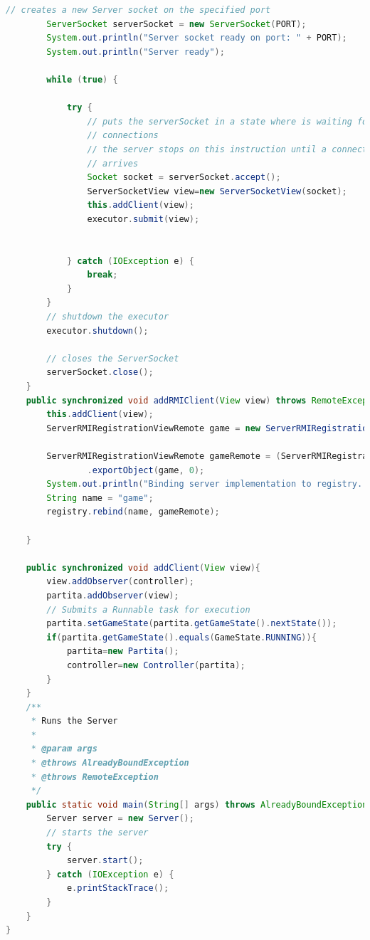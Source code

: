 \documentclass{article}
\begin{document}
\begin{lstlisting}[language=Java,escapechar=|]
		// creates a new Server socket on the specified port
		ServerSocket serverSocket = new ServerSocket(PORT);
		System.out.println("Server socket ready on port: " + PORT);
		System.out.println("Server ready");
		
		while (true) {

			try {
				// puts the serverSocket in a state where is waiting for client
				// connections
				// the server stops on this instruction until a connection
				// arrives
				Socket socket = serverSocket.accept();
				ServerSocketView view=new ServerSocketView(socket);
				this.addClient(view);
				executor.submit(view);
				

			} catch (IOException e) {
				break;
			}
		}
		// shutdown the executor
		executor.shutdown();

		// closes the ServerSocket
		serverSocket.close();
	}
	public synchronized void addRMIClient(View view) throws RemoteException, AlreadyBoundException{
		this.addClient(view);
		ServerRMIRegistrationViewRemote game = new ServerRMIRegistrationView(this);

		ServerRMIRegistrationViewRemote gameRemote = (ServerRMIRegistrationViewRemote) UnicastRemoteObject
				.exportObject(game, 0);
		System.out.println("Binding server implementation to registry...");
		String name = "game";
		registry.rebind(name, gameRemote);

	}

	public synchronized void addClient(View view){
		view.addObserver(controller);
		partita.addObserver(view);
		// Submits a Runnable task for execution
		partita.setGameState(partita.getGameState().nextState());
		if(partita.getGameState().equals(GameState.RUNNING)){
			partita=new Partita();
			controller=new Controller(partita);
		}	
	}
	/**
	 * Runs the Server
	 * 
	 * @param args
	 * @throws AlreadyBoundException 
	 * @throws RemoteException 
	 */
	public static void main(String[] args) throws AlreadyBoundException, RemoteException {
		Server server = new Server();
		// starts the server
		try {
			server.start();
		} catch (IOException e) {
			e.printStackTrace();
		}
	}
}
\end{lstlisting}
\end{document}
